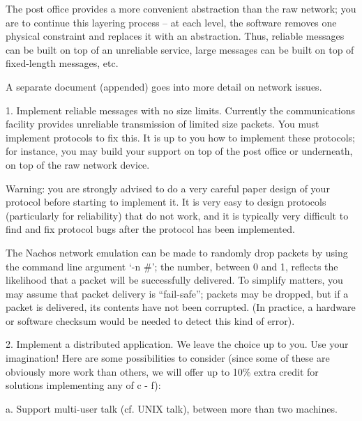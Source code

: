 The post office provides a more convenient abstraction than the raw network; 
you are to continue this layering process -- at each level, the 
software removes one physical constraint and replaces it with an abstraction.
Thus, reliable messages can be built on top of an unreliable service,
large messages can be built on top of fixed-length messages, etc.

A separate document (appended) goes into more detail on network issues. 

\begin{description}

\item{1.} Implement reliable messages with no size limits.
Currently the communications facility provides unreliable transmission
of limited size packets.  You must implement protocols to fix this.
It is up to you how to implement these protocols; for instance, you may 
build your support on top of the post office or underneath, on top of
the raw network device.

Warning: you are strongly advised to do a very careful paper design 
of your protocol before starting to implement it.  It is very
easy to design protocols (particularly for reliability) that do not 
work, and it is typically very difficult to find and fix protocol bugs
after the protocol has been implemented.

The Nachos network emulation can be made to randomly drop packets by 
using the command line argument `-n \#'; the number, between 0 and 1,
reflects the likelihood that a packet will be successfully delivered.
To simplify matters, you may assume that packet delivery is ``fail-safe'';
packets may be dropped, but if a packet is delivered, its contents have 
not been corrupted.  (In practice, a hardware or software checksum would
be needed to detect this kind of error).


\item{2.} Implement a distributed application.
We leave the choice up to you.  Use your imagination!
Here are some possibilities to consider (since some of these are
obviously more work than others, we will offer up to 10\% extra credit
for solutions implementing any of c - f): 

\begin{description}

\item{a.} Support multi-user talk (cf. UNIX talk), between more than 
two machines.


\end{description}
\end{description}
